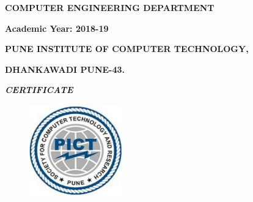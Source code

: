\documentclass[12pt]{article}
\begin{document}
 \par

 \par

\begin{Center}
{\fontsize{20pt}{24.0pt}\selectfont \textbf{COMPUTER ENGINEERING DEPARTMENT}\par}
\end{Center}\par

\begin{Center}
{\fontsize{20pt}{24.0pt}\selectfont \textbf{Academic Year: 2018-19}\par}


\newpage

\end{Center}\par


\vspace{\baselineskip}
\begin{Center}
{\fontsize{20pt}{24.0pt}\selectfont \textbf{ }\par}
\end{Center}\par

\begin{Center}
{\fontsize{14pt}{16.8pt}\selectfont \textbf{PUNE INSTITUTE OF COMPUTER TECHNOLOGY,}\par}
\end{Center}\par

\begin{Center}
{\fontsize{14pt}{16.8pt}\selectfont \textbf{DHANKAWADI PUNE-43.}\par}
\end{Center}\par


\vspace{\baselineskip}
\begin{Center}
{\fontsize{26pt}{31.2pt}\selectfont \textbf{\textit{CERTIFICATE}}{\fontsize{14pt}{16.8pt}\selectfont  \par}\par}
\end{Center}\par




\begin{figure}[H]
	\begin{Center}
		\includegraphics[width=1.57in,height=1.57in]{./media/image1.jpg}
	\end{Center}
\end{figure}
\end{document}
